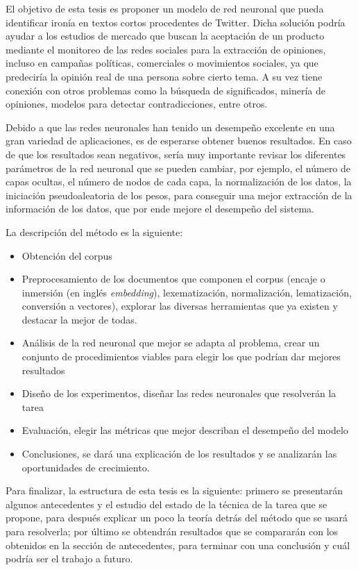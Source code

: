 \par El objetivo de esta tesis es proponer un modelo de red neuronal que pueda identificar ironía en textos cortos procedentes de Twitter. Dicha solución podría ayudar a los estudios de mercado que buscan la aceptación de un producto mediante el monitoreo de las redes sociales para la extracción de opiniones, incluso en campañas políticas, comerciales o movimientos sociales, ya que predeciría la opinión real de una persona sobre cierto tema. A su vez tiene conexión con otros problemas como la búsqueda de significados, minería de opiniones, modelos para detectar contradicciones, entre otros.


\par Debido a que las redes neuronales han tenido un desempeño excelente en una gran variedad de aplicaciones, es de esperarse obtener buenos resultados. En caso de que los resultados sean negativos, sería muy importante revisar los diferentes parámetros de la red neuronal que se pueden cambiar, por ejemplo, el número de capas ocultas, el número de nodos de cada capa, la normalización de los datos, la iniciación pseudoaleatoria de los pesos, para conseguir una mejor extracción de la información de los datos, que por ende mejore el desempeño del sistema.


\par La descripción del método es la siguiente:
\begin{itemize}
	\item Obtención del corpus
	\item Preprocesamiento de los documentos que componen el corpus (encaje o inmersión (en inglés \textit{embedding}), lexematización, normalización, lematización, conversión a vectores), explorar las diversas herramientas que ya existen y destacar la mejor de todas.
	\item Análisis de la red neuronal que mejor se adapta al problema, crear un conjunto de procedimientos viables para elegir los que podrían dar mejores resultados
	\item Diseño de los experimentos, diseñar las redes neuronales que resolverán la tarea
	\item Evaluación, elegir las métricas que mejor describan el desempeño del modelo
	\item Conclusiones, se dará una explicación de los resultados y se analizarán las oportunidades de crecimiento.
\end{itemize}

\par Para finalizar, la estructura de esta tesis es la siguiente: primero se presentarán algunos antecedentes y el estudio del estado de la técnica de la tarea que se propone, para después explicar un poco la teoría detrás del método que se usará para resolverla; por último se obtendrán resultados que se compararán con los obtenidos en la sección de antecedentes, para terminar con una conclusión y cuál podría ser el trabajo a futuro.

